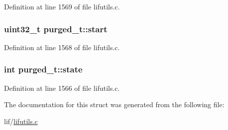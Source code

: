 Definition at line 1569 of file lifutils.\+c.

\subsubsection[{\texorpdfstring{start}{start}}]{\setlength{\rightskip}{0pt plus 5cm}uint32\+\_\+t purged\+\_\+t\+::start}\hypertarget{structpurged__t_afeb1148800092fe0b7e73a9dc6839a37}{}\label{structpurged__t_afeb1148800092fe0b7e73a9dc6839a37}


Definition at line 1568 of file lifutils.\+c.

\subsubsection[{\texorpdfstring{state}{state}}]{\setlength{\rightskip}{0pt plus 5cm}int purged\+\_\+t\+::state}\hypertarget{structpurged__t_a2c08c2063d9649c18d5316a50cf5bec6}{}\label{structpurged__t_a2c08c2063d9649c18d5316a50cf5bec6}


Definition at line 1566 of file lifutils.\+c.



The documentation for this struct was generated from the following file\+:\begin{DoxyCompactItemize}
\item 
lif/\hyperlink{lifutils_8c}{lifutils.\+c}\end{DoxyCompactItemize}
